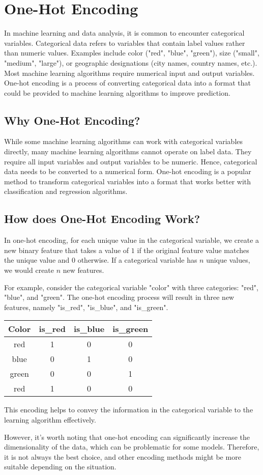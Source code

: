 \chapter{One-Hot Encoding}

In machine learning and data analysis, it is common to encounter categorical variables. Categorical data refers to variables that contain label values rather than numeric values. Examples include color ("red", "blue", "green"), size ("small", "medium", "large"), or geographic designations (city names, country names, etc.). Most machine learning algorithms require numerical input and output variables. One-hot encoding is a process of converting categorical data into a format that could be provided to machine learning algorithms to improve prediction.

\section{Why One-Hot Encoding?}
While some machine learning algorithms can work with categorical variables directly, many machine learning algorithms cannot operate on label data. They require all input variables and output variables to be numeric. Hence, categorical data needs to be converted to a numerical form. One-hot encoding is a popular method to transform categorical variables into a format that works better with classification and regression algorithms.

\section{How does One-Hot Encoding Work?}
In one-hot encoding, for each unique value in the categorical variable, we create a new binary feature that takes a value of $1$ if the original feature value matches the unique value and $0$ otherwise. If a categorical variable has $n$ unique values, we would create $n$ new features.

For example, consider the categorical variable "color" with three categories: "red", "blue", and "green". The one-hot encoding process will result in three new features, namely "is\_red", "is\_blue", and "is\_green".

\begin{tabular}{|c|c|c|c|}
\textbf{Color} & \textbf{is\_red} & \textbf{is\_blue} & \textbf{is\_green} \\
\hline
red & 1 & 0 & 0 \\
blue & 0 & 1 & 0 \\
green & 0 & 0 & 1 \\
red & 1 & 0 & 0 \\
\hline
\end{tabular}

This encoding helps to convey the information in the categorical variable to the learning algorithm effectively.

However, it's worth noting that one-hot encoding can significantly increase the dimensionality of the data, which can be problematic for some models. Therefore, it is not always the best choice, and other encoding methods might be more suitable depending on the situation.


